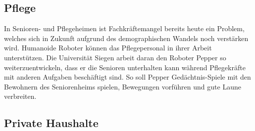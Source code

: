 \subsection{Pflege}
In Senioren- und Pflegeheimen ist Fachkräftemangel bereits heute ein Problem,
welches sich in Zukunft aufgrund des demographischen Wandels noch verstärken
wird. Humanoide Roboter können das Pflegepersonal in ihrer Arbeit unterstützen.
Die Universität Siegen arbeit daran den Roboter Pepper so weiterzuentwickeln,
dass er die Senioren unterhalten kann während Pflegekräfte mit anderen Aufgaben
beschäftigt sind. So soll Pepper Gedächtnis-Spiele mit den Bewohnern des
Seniorenheims spielen, Bewegungen vorführen und gute Laune verbreiten. \cite{Frei2017}

\subsection{Private Haushalte}

